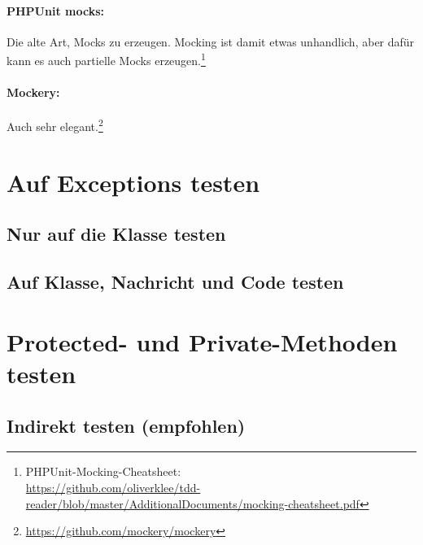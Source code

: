 \documentclass[a4paper,11pt,headsepline]{scrartcl}
\begin{document}
\paragraph{PHPUnit mocks:} Die alte Art, Mocks zu erzeugen. Mocking ist damit etwas unhandlich, aber dafür kann es auch partielle Mocks erzeugen.\footnote{PHPUnit-Mocking-Cheatsheet:\\ \url{https://github.com/oliverklee/tdd-reader/blob/master/AdditionalDocuments/mocking-cheatsheet.pdf}}
\paragraph{Mockery:} Auch sehr elegant.\footnote{\url{https://github.com/mockery/mockery}}



\pagebreak
\section{Auf Exceptions testen}

\subsection{Nur auf die Klasse testen}

\subsection{Auf Klasse, Nachricht und Code testen}


\section{Protected- und Private-Methoden testen}

\subsection{Indirekt testen (empfohlen)}
\end{document}
